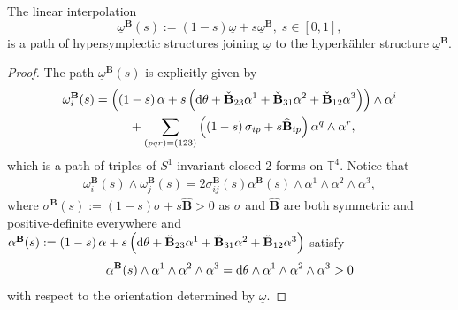 \documentclass[10pt,a4paper]{amsart}
\newcommand{\diff}{\text{\rm d}}
\begin{document}
\begin{proposition}\label{linear-interp}
The linear interpolation
\begin{equation}
    \underline\omega^\mathbf{B}(s)
    := 
    \left(1-s\right)\underline\omega
    + 
    s\underline\omega^\mathbf{B}, \; s\in [0,1],
\end{equation}
is a path of hypersymplectic structures joining $\underline{\omega}$ to the hyperk\"ahler structure $\underline{\omega}^{\mathbf{B}}$.
\end{proposition}

\begin{proof}
The path $\underline\omega^\mathbf{B}(s)$ is explicitly given by
\begin{align}
\omega_i^\mathbf{B}(s)
& = 
\left( \left(1-s\right)\alpha + s\left(\diff\theta+ \check{\mathbf{B}}_{23}\alpha^1 + \check{\mathbf{B}}_{31}\alpha^2 + \check{\mathbf{B}}_{12}\alpha^3\right)\right)\wedge \alpha^i \nonumber \\
&\phantom{=}\qquad
+ 
\sum_{(pqr)=(123)}\left( \left(1-s\right)\sigma_{ip}+ s\widehat{\mathbf{B}}_{ip}\right)\alpha^q\wedge\alpha^r,
\end{align}
which is a path of triples of $S^1$-invariant closed $2$-forms on $\mathbb{T}^4$. Notice that
\begin{align*}
\omega_i^\mathbf{B}(s)\wedge\omega_j^\mathbf{B}(s)
= 
2\sigma_{ij}^\mathbf{B}(s)\alpha^\mathbf{B}(s)\wedge\alpha^1\wedge\alpha^2\wedge\alpha^3,
\end{align*}
where $\sigma^\mathbf{B}(s):=\left(1-s\right)\sigma+s\widehat{\mathbf{B}}>0$ as $\sigma$ and $\widehat{\mathbf{B}}$ are both symmetric and positive-definite everywhere and $\alpha^\mathbf{B}(s):=\left(1-s\right)\alpha + s\left(\diff\theta+ \check{\mathbf{B}}_{23}\alpha^1 + \check{\mathbf{B}}_{31}\alpha^2 + \check{\mathbf{B}}_{12}\alpha^3\right)$ satisfy
\[ 
\alpha^\mathbf{B}(s)\wedge\alpha^1\wedge\alpha^2\wedge\alpha^3
=
\diff \theta\wedge\alpha^1\wedge\alpha^2\wedge\alpha^3>0
\]
with respect to the orientation determined by $\underline\omega$.
\end{proof}
\end{document}
